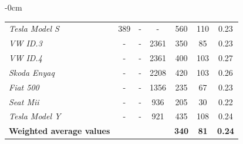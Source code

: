 \begin{table}[H]
\begin{adjustwidth}{-\extralength}{0cm}
{\begin{tabular}{@{}lcccccc@{}}
\textit{Tesla Model S}           & 389        & -          & -          & 560                     & 110                                                                                                   & 0.23                                                                                            \\
\textit{VW ID.3}                  & -          & -          & 2361       & 350                     & 85                                                                                                    & 0.23                                                                                            \\
\textit{VW ID.4}                  & -          & -          & 2361       & 400                     & 103                                                                                                   & 0.27                                                                                            \\
\textit{Skoda Enyaq}             & -          & -          & 2208       & 420                     & 103                                                                                                   & 0.26                                                                                            \\
\textit{Fiat 500}                & -          & -          & 1356       & 235                     & 67                                                                                                    & 0.23                                                                                            \\
\textit{Seat Mii}                & -          & -          & 936        & 205                     & 30                                                                                                    & 0.22                                                                                            \\
\textit{Tesla Model Y}           & -          & -          & 921        & 435                     & 108                                                                                                   & 0.24                                                                                            \\ \midrule
\textbf{Weighted average values} &            &            &            & \textbf{340}            & \textbf{81}                                                                                           & \textbf{0.24}                                                                                   \\ \bottomrule
\end{tabular}%
}
\end{adjustwidth}
\end{table}

